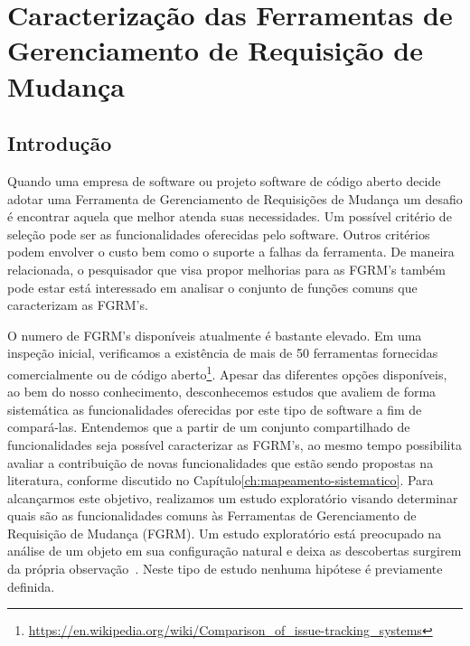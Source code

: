 \chapter{Caracterização das Ferramentas de Gerenciamento de Requisição de
	Mudança}
\label{ch:caracterizacao}


\section{Introdução}

Quando uma empresa de software ou projeto software de código aberto decide
adotar uma Ferramenta de Gerenciamento de Requisições de Mudança um desafio é
encontrar aquela que melhor atenda suas necessidades. Um possível critério de
seleção pode ser as funcionalidades oferecidas pelo software. Outros critérios
podem envolver o custo bem como o suporte a falhas da ferramenta. De maneira
relacionada, o pesquisador que visa propor melhorias para as FGRM's também
pode estar está interessado em analisar o conjunto de funções comuns que
caracterizam as FGRM's.

O numero de FGRM's disponíveis atualmente é bastante elevado. Em uma inspeção
inicial, verificamos a existência de mais de 50 ferramentas fornecidas
comercialmente ou de código
aberto\footnote{\url{https://en.wikipedia.org/wiki/Comparison_of_issue-tracking_systems}}.
Apesar das diferentes opções disponíveis, ao bem do nosso conhecimento,
desconhecemos estudos que avaliem de forma sistemática as funcionalidades
oferecidas por este tipo de software a fim de compará-las. Entendemos que a
partir de um conjunto compartilhado de funcionalidades seja possível
caracterizar as FGRM's, ao mesmo tempo possibilita avaliar a contribuição de
novas funcionalidades que estão sendo propostas na literatura, conforme
discutido no Capítulo\ref{ch:mapeamento-sistematico}. Para alcançarmos este
objetivo, realizamos um estudo exploratório visando determinar quais são as
funcionalidades comuns às Ferramentas de Gerenciamento de Requisição de Mudança
(FGRM). Um estudo exploratório está preocupado na análise de um objeto em sua
configuração natural e deixa as descobertas surgirem da própria
observação~\cite{wohlin2012experimentation}. Neste tipo de estudo nenhuma
hipótese é previamente definida.

